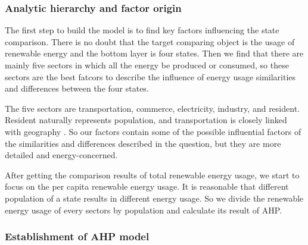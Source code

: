\documentclass[a4paper,11pt]{article}
\begin{document}
\subsubsection{Analytic hierarchy and factor origin}

\par The first step to build the model is to find key factors influencing the state comparison. There is no doubt that the target comparing object is the usage of renewable energy and the bottom layer is four states. Then we find that there are mainly five sectors in which all the energy be produced or consumed, so these sectors are the best fatcors to describe the influence of energy usage similarities and differences between the four states.

\par The five sectors are transportation, commerce, electricity, industry, and resident. Resident naturally represents population, and transportation is closely linked with geography \cite{L1}. So our factors contain some of the possible influential factors of the similarities and differences described in the question, but they are more detailed and energy-concerned.

\par After getting the comparison results of total renewable energy usage, we start to focus on the per capita renewable energy usage. It is reasonable that different population of a state results in different energy usage. So we divide the renewable energy usage of every sectors by population and calculate its result of AHP.

\subsubsection{Establishment of AHP model}

\end{document}
